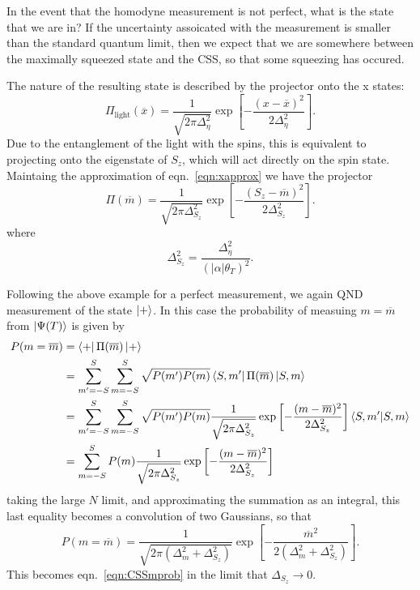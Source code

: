\documentclass{article}
\newcommand*\meas[1]{\overline{#1}}
\begin{document}
In the event that the homodyne measurement is not perfect, what is the state
that we are in? If the uncertainty assoicated with the measurement is smaller
than the standard quantum limit, then we expect that we are somewhere between
the maximally squeezed state and the CSS, so that some squeezing has
occured.

The nature of the resulting state is described by the
projector onto the x states:~\cite{Cox2016, Zhang2019}
%
\begin{equation}
  \Pi_\text{light}(\meas{x}) = \frac{1}{\sqrt{2\pi\Delta_\eta^2}}\exp\left[
    -\frac{(x-\meas{x})^2}{2\Delta_\eta^2}\right].
\end{equation}
%
Due to the entanglement of the light with the spins, this is equivalent to
projecting onto the eigenstate of $S_z$, which will act directly on the spin
state. Maintaing the approximation of
eqn.~\ref{eqn:xapprox}
we have the projector
%
\begin{equation}
  \Pi(\meas{m}) = \frac{1}{\sqrt{2\pi\Delta_{S_z}^2}}\exp\left[
    -\frac{(S_z-\meas{m})^2}{2\Delta_{S_z}^2}\right].
\end{equation}
%
where
%
\begin{equation}
  \Delta_{S_z}^2 = \frac{\Delta_\eta^2}{(|\alpha|\theta_T)^2}.
\end{equation}

Following the above example for a perfect measurement, we again QND measurement
of the state $\ket{+}$. In this case the probability of measuing $m=\meas{m}$
from $\ket{\Psi(T)}$ is given by~\cite{}
%
\begin{align}
  P(m=\meas{m}) &= \bra{+}\Pi(\meas{m})\ket{+}\\
  & = \sum_{m'=-S}^S \sum_{m=-S}^S \sqrt{P(m')P(m)}\bra{S,
  m'}\Pi(\meas{m})\ket{S, m} \\
  & = \sum_{m'=-S}^S \sum_{m=-S}^S \sqrt{P(m')P(m)}
  \frac{1}{\sqrt{2\pi\Delta_{S_z}^2}}\exp\left[-\frac{(m-\meas{m})^2}{2\Delta_{S_z}^2}\right] 
  \bra{S, m'}\ket{S, m} \\
  &= \sum_{m=-S}^{S} P(m) 
  \frac{1}{\sqrt{2\pi\Delta_{S_z}^2}}\exp\left[-\frac{(m-\meas{m})^2}{2\Delta_{S_z}^2}\right] 
\end{align}
%
taking the large $N$ limit, and approximating the summation as an integral,
this last equality becomes a convolution of two Gaussians, so that
%
\begin{equation}
  P(m=\meas{m}) = \frac{1}{\sqrt{2\pi(\Delta_m^2 + \Delta_{S_z}^2)}}\exp\left[
    -\frac{\meas{m}^2}{2(\Delta_m^2 + \Delta_{S_z}^2)}\right].
\end{equation}
%
This becomes eqn.~\ref{eqn:CSSmprob} in the limit that $\Delta_{S_z} \to 0$.
\end{document}
